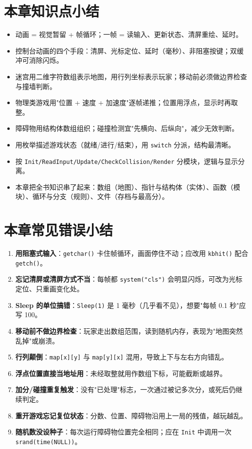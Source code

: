 \section{本章知识点小结}
\begin{itemize}
  \item 动画 = 视觉暂留 + 帧循环；一帧 = 读输入、更新状态、清屏重绘、延时。
  \item 控制台动画的四个手段：清屏、光标定位、延时（毫秒）、非阻塞按键；双缓冲可消除闪烁。
  \item 迷宫用二维字符数组表示地图，用行列坐标表示玩家；移动前必须做边界检查与撞墙判断。
  \item 物理类游戏用"位置 + 速度 + 加速度"逐帧递推；位置用浮点，显示时再取整。
  \item 障碍物用结构体数组组织；碰撞检测宜"先横向、后纵向"，减少无效判断。
  \item 用枚举描述游戏状态（就绪/进行/结束），用 \texttt{switch} 分派，结构最清晰。
  \item 按 \texttt{Init/ReadInput/Update/CheckCollision/Render} 分模块，逻辑与显示分离。
  \item 本章把全书知识串了起来：数组（地图）、指针与结构体（实体）、函数（模块）、循环与分支（规则）、文件（存档与最高分）。
\end{itemize}

\section{本章常见错误小结}
\begin{enumerate}
  \item \textbf{用阻塞式输入}：\texttt{getchar()} 卡住帧循环，画面停住不动；应改用 \texttt{kbhit()} 配合 \texttt{getch()}。
  \item \textbf{忘记清屏或清屏方式不当}：每帧都 \texttt{system("cls")} 会明显闪烁，可改为光标定位、只重画变化处。
  \item \textbf{Sleep 的单位搞错}：\texttt{Sleep(1)} 是 1 毫秒（几乎看不见），想要"每帧 0.1 秒"应写 100。
  \item \textbf{移动前不做边界检查}：玩家走出数组范围，读到随机内存，表现为"地图突然乱掉"或崩溃。
  \item \textbf{行列颠倒}：\texttt{map[x][y]} 与 \texttt{map[y][x]} 混用，导致上下与左右方向错乱。
  \item \textbf{浮点位置直接当地址用}：未经取整就用作数组下标，可能截断或越界。
  \item \textbf{加分/碰撞重复触发}：没有"已处理"标志，一次通过被记多次分，或死后仍继续判定。
  \item \textbf{重开游戏忘记复位状态}：分数、位置、障碍物沿用上一局的残值，越玩越乱。
  \item \textbf{随机数没设种子}：每次运行障碍物位置完全相同；应在 \texttt{Init} 中调用一次 \texttt{srand(time(NULL))}。
\end{enumerate}
